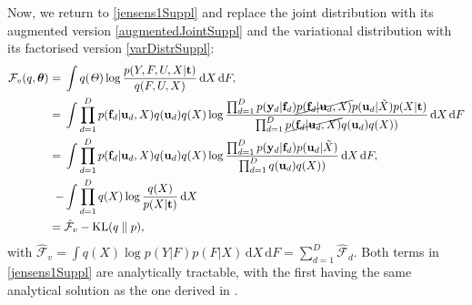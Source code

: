 %
Now, we return to \ref{jensens1Suppl} and replace the joint
distribution with its augmented version \eqref{augmentedJointSuppl}
and the variational distribution with its factorised version
\eqref{varDistrSuppl}:
\begin{align}
\mathcal{F}_v(q, \boldsymbol \theta) = {}& \int q(\mathit{\Theta}) \log 
		\frac{ p(Y,F, U,X | \mathbf{t})}
			 {q(F, U,X)}  \, \mathrm{d} X \,\mathrm{d}F,
 	    \nonumber \\
= {}& \int \prod_{d=1}^D p(\mathbf{f}_d | \mathbf{u}_d, X )q(\mathbf{u}_d) q(X) 
	    \log  \frac{\prod_{d=1}^D p(\mathbf{y}_d | \mathbf{f}_d) \cancel{p(\mathbf{f}_d | \mathbf{u}_d, \mathit{X})}
						p(\mathbf{u}_d | \tilde{X})  p(X | \mathbf{t})}
 	      		   {\prod_{d=1}^D \cancel{p(\mathbf{f}_d | \mathbf{u}_d, X )}q(\mathbf{u}_d) q(X))}   \, \mathrm{d} X \,\mathrm{d}F \nonumber \\
= {}& \int \prod_{d=1}^D p(\mathbf{f}_d | \mathbf{u}_d, X )q(\mathbf{u}_d) q(X) 
		\log  \frac{\prod_{d=1}^D p(\mathbf{y}_d | \mathbf{f}_d) p(\mathbf{u}_d | \tilde{X})}
				   {\prod_{d=1}^D q(\mathbf{u}_d) q(X))}   \, \mathrm{d} X \,\mathrm{d}F, \nonumber \\
- {}& \int \prod_{d=1}^D  q(X)   \log \frac{q(X)}{p(X | \mathbf{t})}   \, \mathrm{d} X \nonumber \\
= {}& \hat{\mathcal{F}}_v - \text{KL}(q \parallel p), \label{jensens1Suppl}
\end{align}
%
with $\hat{\mathcal{F}}_v =\int q(X) \log p( Y | F ) p( F | X) \,
\mathrm{d} X \,\mathrm{d}F = \sum_{d=1}^D \hat{\mathcal{F}}_d$. Both
terms in \eqref{jensens1Suppl} are analytically tractable, with the
first having the same analytical solution as the one derived in
\cite{BayesianGPLVM}.

